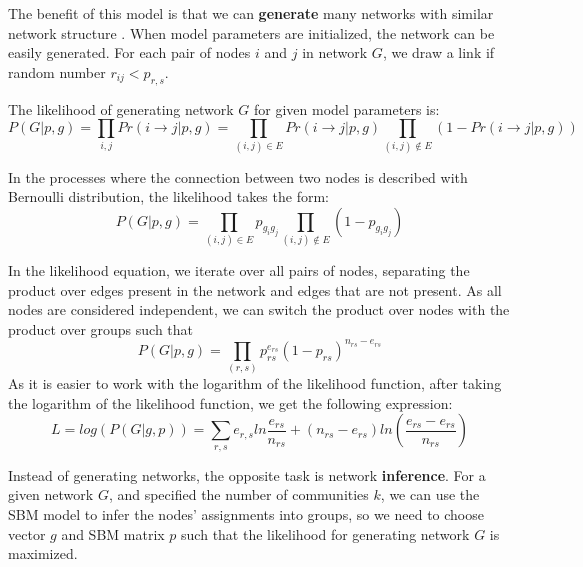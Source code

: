 The benefit of this model is that we can \textbf{generate} many networks with similar network structure \cite{rosvall2019different}. When model parameters are initialized, the network can be easily generated. For each pair of nodes $i$ and $j$ in network $G$, we draw a link if random number $r_{ij}<p_{r, s}$. 

The likelihood of generating network $G$ for given model parameters is:
\begin{equation}
P(G|p, g) = \prod_{i,j} Pr(i \rightarrow j| p, g) = \prod_{(i,j)\in E} Pr(i \rightarrow j| p, g)\prod_{(i,j)\notin E} ( 1 - Pr(i \rightarrow j| p, g))
\end{equation}

In the processes where the connection between two nodes is described with Bernoulli distribution, the likelihood takes the form:
\begin{equation}
P(G|p, g) = \prod_{(i,j)\in E} p_{g_ig_j}\prod_{(i,j)\notin E} ( 1 - p_{g_ig_j})
\end{equation}

In the likelihood equation, we iterate over all pairs of nodes, separating the product over edges present in the network and edges that are not present.  
As all nodes are considered independent, we can switch the product over nodes with the product over groups such that
\begin{equation}
P(G|p, g) = \prod_{(r,s)} p_{rs}^{e_{rs}}(1-p_{rs})^{n_{rs}-e_{rs}}
\end{equation}
As it is easier to work with the logarithm of the likelihood function, after taking the logarithm of the likelihood function, we get the following expression:
\begin{equation}
L = log(P(G|g, p)) = \sum_{r,s} e_{r,s} ln\frac{e_{rs}}{n_{rs}} + (n_{rs}-e_{rs})ln(\frac{e_{rs}-e_{rs}}{n_{rs}})
\end{equation}

Instead of generating networks, the opposite task is network \textbf{inference}. For a given network $G$, and specified the number of communities $k$, we can use the SBM model to infer the nodes' assignments into groups, so we need to choose vector $g$ and SBM matrix $p$ such that the likelihood for generating network $G$ is maximized. 

